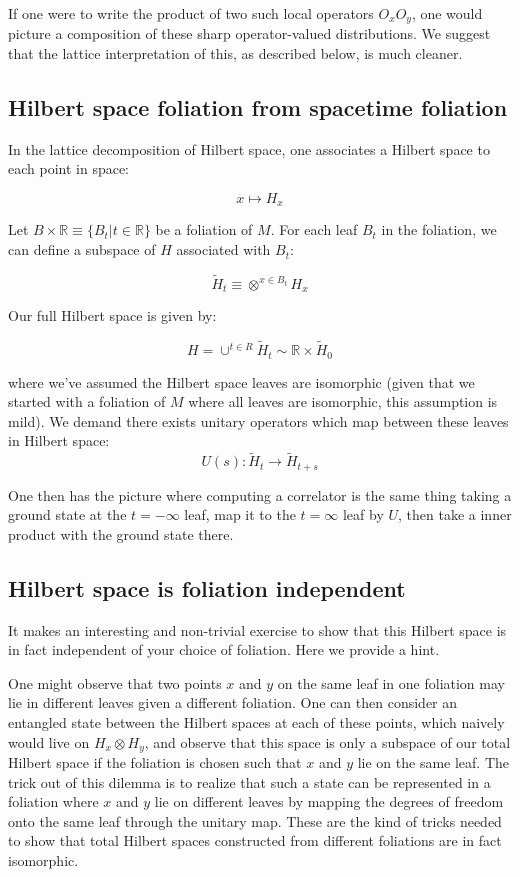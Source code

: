 If one were to write the product of two such local operators $O_xO_y$, one would picture a composition of these sharp operator-valued distributions. We suggest that the lattice interpretation of this, as described below, is much cleaner.



\subsection{ Hilbert space foliation from spacetime foliation}

In the lattice decomposition of Hilbert space, one associates a Hilbert space to each point in space:

$$x \mapsto H_x$$


Let $B \times \mathbb{R} \equiv \{B_t | t \in \mathbb{R}\}$ be a foliation of $M$. For each leaf $B_t$ in the foliation, we can define a subspace of $H$ associated with $B_t$:

$$\tilde H_{t} \equiv \otimes^{x \in B_t} H_x$$

Our full Hilbert space is given by:

$$ H = \cup^{t \in R} \tilde H_t \sim \mathbb{R} \times \tilde H_0 $$

where we've assumed the Hilbert space leaves are isomorphic (given that we started with a foliation of $M$ where all leaves are isomorphic, this assumption is mild). We demand there exists unitary operators which map between these leaves in Hilbert space:
$$U(s) : \tilde H_t \to \tilde H_{t + s}$$

One then has the picture where computing a correlator is the same thing taking a ground state at the $t = -\infty$ leaf, map it to the $t = \infty$ leaf by $U$, then take a inner product with the ground state there.

\subsection{ Hilbert space is foliation independent}
It makes an interesting and non-trivial exercise to show that this Hilbert space is in fact independent of your choice of foliation. Here we provide a hint.

One might observe that two points $x$ and $y$ on the same leaf in one foliation may lie in different leaves given a different foliation. One can then consider an entangled state between the Hilbert spaces at each of these points, which naively would live on  $H_x \otimes H_y$, and observe that this space is only a subspace of our total Hilbert space if the foliation is chosen such that $x$ and $y$ lie on the same leaf. The trick out of this dilemma is to realize that such a state can be represented in a foliation where $x$ and $y$ lie on different leaves by mapping the degrees of freedom onto the same leaf through the unitary map. These are the kind of tricks needed to show that total Hilbert spaces constructed from different foliations are in fact isomorphic.

